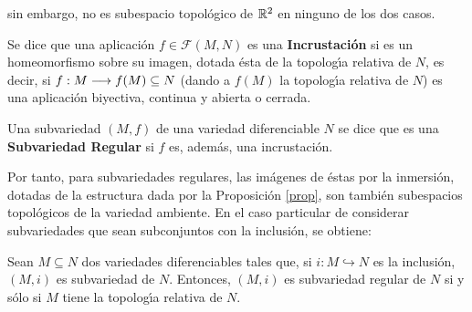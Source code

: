 \documentclass[cursovd_portada.tex]{subfiles}
\begin{document}
sin embargo, no es subespacio topol\'{o}gico de $\mathbb{R}^2$ en ninguno de los dos casos.
\begin{defi}
Se dice que una aplicaci\'{o}n $f\in\mathcal{F}(M,N)$ es una {\bf In\-crus\-ta\-ci\'{o}n} si es un homeomorfismo sobre su
imagen, dotada \'{e}sta de la topolog\'{\i}a relativa de $N$, es decir, si $f:M\longrightarrow f(M)\subseteq N$ (dando a $f(M)$ la
topolog\'{\i}a relativa de $N$) es una aplicaci\'{o}n biyectiva, continua y abierta o cerrada. \end{defi}
\begin{defi}
Una subvariedad $(M,f)$ de una variedad diferenciable $N$ se dice que es una {\bf Subvariedad Regular} si $f$ es,
adem\'{a}s, una incrustaci\'{o}n.
\end{defi}
Por tanto, para subvariedades regulares, las im\'{a}genes de \'{e}stas por la inmersi\'{o}n, dotadas de la estructura dada por
la Proposici\'{o}n \ref{prop}, son tambi\'{e}n subespacios topol\'{o}gicos de la variedad ambiente. En el caso particular de
considerar subvariedades que sean subconjuntos con la inclusi\'{o}n, se obtiene:
\begin{prop}
Sean $M\subseteq N$ dos variedades diferenciables tales que, si $i:M\hookrightarrow N$ es la inclusi\'{o}n, $(M,i)$ es
subvariedad de $N$. Entonces, $(M,i)$ es subvariedad regular de $N$ si y s\'{o}lo si $M$ tiene la topolog\'{\i}a relativa
de $N$.
\end{prop}
\end{document}
